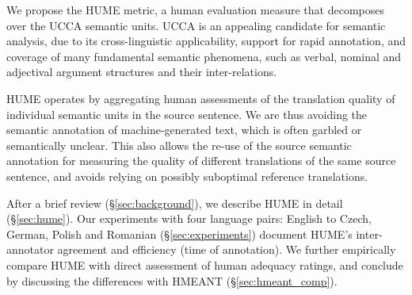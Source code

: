 \documentclass[11pt,letterpaper]{article}
\newcommand{\secref}[1]{\S\ref{#1}}
\newcommand{\XXX}[1]{{\color{red}XXX #1}} %
\newcommand{\bh}[1]{\footnote{\color{blue}BH: #1}}
\def\parcite#1{\cite{#1}}
\begin{document}

We propose the HUME metric,
a human evaluation measure that decomposes over the UCCA semantic units.
UCCA \parcite{abend2013universal} is an appealing candidate for semantic analysis,
due to its cross-linguistic applicability, support for rapid annotation, and coverage
of many fundamental semantic phenomena, such as verbal, nominal and adjectival
argument structures and their inter-relations.

HUME operates by aggregating human assessments of the translation quality of individual
semantic units in the source sentence. We 
are thus avoiding the semantic annotation of machine-generated text,
which is often garbled or semantically unclear.
This also allows the re-use of the source semantic annotation for
measuring the quality of different translations of the same source sentence,
and 
avoids relying on possibly suboptimal reference translations.

After a brief review (\secref{sec:background}), we describe HUME in detail
(\secref{sec:hume}).
Our experiments with four language pairs: English to Czech, German, Polish and Romanian (\secref{sec:experiments}) document HUME's inter-annotator agreement and efficiency (time of annotation). We further empirically compare HUME with direct assessment of human adequacy ratings, and conclude by discussing the differences with HMEANT (\secref{sec:hmeant_comp}).

% 
\end{document}
